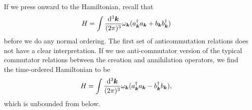 {If we press onward to the Hamiltonian, recall that
\begin{align}
    H = \int \frac{\dd[3]{\vb*{k}}}{(2 \pi)^3} \omega_{\vb*{k}} ( a_{\vb*{k}}^{\dagger} a_{\vb*{k}} + b_{\vb*{k}} b_{\vb*{k}}^{\dagger} )
\end{align}
before we do any normal ordering.
The first set of anticommutation relations does not have a clear interpretation.
If we use anti-commutator version of the typical commutator relations between the creation and annihilation operators, we find the time-ordered Hamiltonian to be
\begin{align}
    H = \int \frac{\dd[3]{\vb*{k}}}{(2 \pi)^3} \omega_{\vb*{k}} ( a_{\vb*{k}}^{\dagger} a_{\vb*{k}} - b_{\vb*{k}}^{\dagger} b_{\vb*{k}} )
,\end{align}
which is unbounded from below.

}



